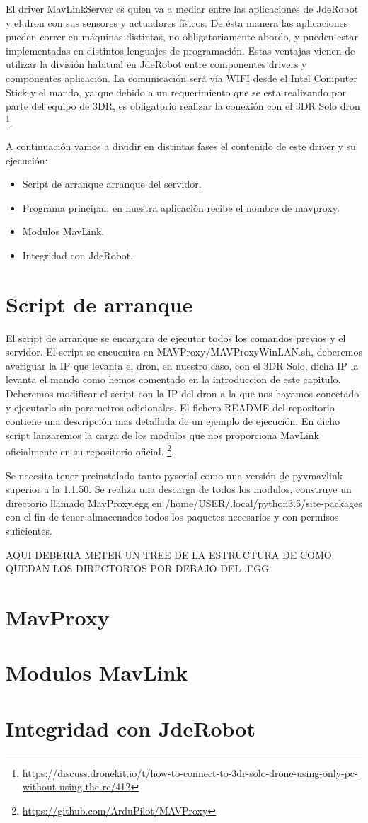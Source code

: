 El driver MavLinkServer es quien va a mediar entre las aplicaciones de JdeRobot y el dron con sus sensores y actuadores físicos. De ésta manera las aplicaciones pueden correr en máquinas distintas, no obligatoriamente abordo, y pueden estar implementadas en distintos lenguajes de programación. Estas ventajas vienen de utilizar la división habitual en JdeRobot entre componentes drivers y componentes aplicación. La comunicación será vía WIFI desde el Intel Computer Stick y el mando, ya que debido a un requerimiento que se esta realizando por parte del equipo de 3DR, es obligatorio realizar la conexión con el 3DR Solo dron \footnote{\url{https://discuss.dronekit.io/t/how-to-connect-to-3dr-solo-drone-using-only-pc-without-using-the-rc/412}}.

A continuación vamos a dividir en distintas fases el contenido de este driver y su ejecución:

\begin{itemize}
\item Script de arranque arranque del servidor.
\item Programa principal, en nuestra aplicación recibe el nombre de mavproxy.
\item Modulos MavLink.
\item Integridad con JdeRobot.
\end{itemize}

\section{Script de arranque}

El script de arranque se encargara de ejecutar todos los comandos previos y el servidor. El script se encuentra en MAVProxy/MAVProxyWinLAN.sh, deberemos averiguar la IP que levanta el dron, en nuestro caso, con el 3DR Solo, dicha IP la levanta el mando como hemos comentado en la introduccion de este capitulo. Deberemos modificar el script con la IP del dron a la que nos hayamos conectado y ejecutarlo sin parametros adicionales. El fichero README del repositorio contiene una descripción mas detallada de un ejemplo de ejecución.
En dicho script lanzaremos la carga de los modulos que nos proporciona MavLink oficialmente en su repositorio oficial. 
\footnote{\url{https://github.com/ArduPilot/MAVProxy}}. 

Se necesita tener preinstalado tanto pyserial como una versión de pyvmavlink superior a la 1.1.50. Se realiza una descarga de todos los modulos, construye un directorio llamado MavProxy.egg en /home/USER/.local/python3.5/site-packages con el fin de tener almacenados todos los paquetes necesarios y con permisos suficientes. 

AQUI DEBERIA METER UN TREE DE LA ESTRUCTURA DE COMO QUEDAN LOS DIRECTORIOS POR DEBAJO DEL .EGG




\section{MavProxy}

\section{Modulos MavLink}

\section{Integridad con JdeRobot}
